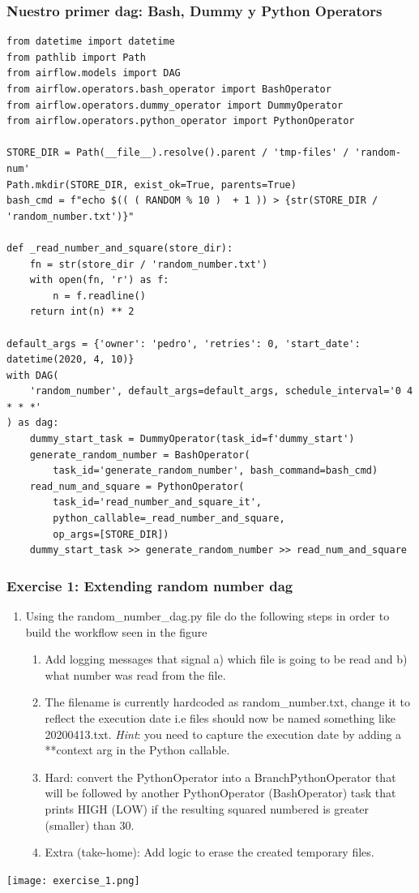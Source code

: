 \documentclass[leqno, 10pt, envcountsect]{beamer}
\numberwithin{equation}{section}
\theoremstyle{definition}
\theoremstyle{example}
\numberwithin{figure}{section}
\numberwithin{table}{section}
\let\olditem\item
\renewcommand{\item}{%
\olditem\vspace{1pt}}
\begin{document}
\begin{frame}[fragile=singleslide]
  \frametitle{Nuestro primer dag: Bash, Dummy y Python Operators}
  \begin{verbatim}
from datetime import datetime
from pathlib import Path
from airflow.models import DAG
from airflow.operators.bash_operator import BashOperator
from airflow.operators.dummy_operator import DummyOperator
from airflow.operators.python_operator import PythonOperator

STORE_DIR = Path(__file__).resolve().parent / 'tmp-files' / 'random-num'
Path.mkdir(STORE_DIR, exist_ok=True, parents=True)
bash_cmd = f"echo $(( ( RANDOM % 10 )  + 1 )) > {str(STORE_DIR / 'random_number.txt')}"

def _read_number_and_square(store_dir):
    fn = str(store_dir / 'random_number.txt')
    with open(fn, 'r') as f:
        n = f.readline()
    return int(n) ** 2

default_args = {'owner': 'pedro', 'retries': 0, 'start_date': datetime(2020, 4, 10)}
with DAG(
    'random_number', default_args=default_args, schedule_interval='0 4 * * *'
) as dag:
    dummy_start_task = DummyOperator(task_id=f'dummy_start')
    generate_random_number = BashOperator(
        task_id='generate_random_number', bash_command=bash_cmd)
    read_num_and_square = PythonOperator(
        task_id='read_number_and_square_it',
        python_callable=_read_number_and_square,
        op_args=[STORE_DIR])
    dummy_start_task >> generate_random_number >> read_num_and_square
  \end{verbatim}

\end{frame}
\begin{frame}[fragile=singleslide]
  \frametitle{Exercise 1: Extending random number dag}
  \begin{enumerate}
    \item Using the random_number_dag.py file do the following steps in order
      to build the workflow seen in the figure
    \begin{enumerate}
      \item Add logging messages that signal a) which file is going to be read and b) what number was read from the file.
      \item The filename is currently hardcoded as random_number.txt, change it
        to reflect the execution date i.e files should now be named something
        like 20200413.txt. \textit{Hint}: you need to capture the execution date by
        adding a **context arg in the Python callable.
      \item Hard: convert the PythonOperator into a BranchPythonOperator that will be followed by another PythonOperator (BashOperator) task that prints HIGH (LOW) if the resulting squared numbered is greater (smaller) than 30.
      \item Extra (take-home): Add logic to erase the created temporary files.
    \end{enumerate}
  \end{enumerate}
  \begin{center}
    \texttt{[image: exercise\_1.png]}
  \end{center}
\end{frame}
\end{document}
